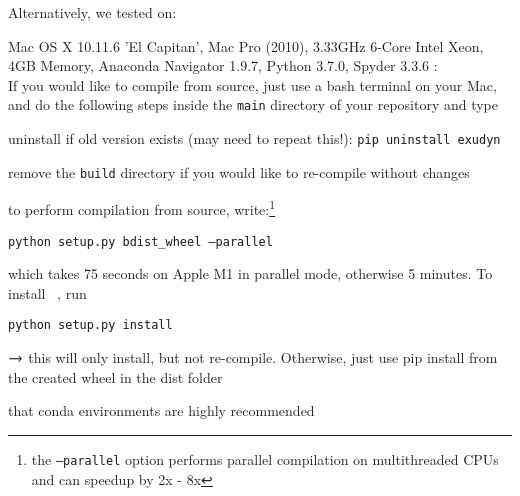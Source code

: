 Alternatively, we tested on:
\bi
  \item Mac OS X 10.11.6 'El Capitan', Mac Pro (2010), 3.33GHz 6-Core Intel Xeon, 4GB Memory, Anaconda Navigator 1.9.7, Python 3.7.0, Spyder 3.3.6
\ei
%
%
\vspace{9pt}
:\vspace{3pt}\\
If you would like to compile from source, just use a bash terminal on your Mac, and do the following steps inside the \texttt{main} directory of your repository and type
\bi
  \item uninstall if old version exists (may need to repeat this!): \texttt{pip uninstall exudyn}
  \item remove the \texttt{build} directory if you would like to re-compile without changes
  \item to perform compilation from source, write:\footnote{the \texttt{--parallel} option performs parallel compilation on multithreaded CPUs and can speedup by 2x - 8x}
  \item \texttt{python setup.py bdist\_wheel --parallel}
  \item which takes 75 seconds on Apple M1 in parallel mode, otherwise 5 minutes. To install \codeName\ , run
  \item[] \texttt{python setup.py install}
  \item[] $\rightarrow$ this will only install, but not re-compile. Otherwise, just use pip install from the created wheel in the dist folder
  \item[]  that conda environments are highly recommended
